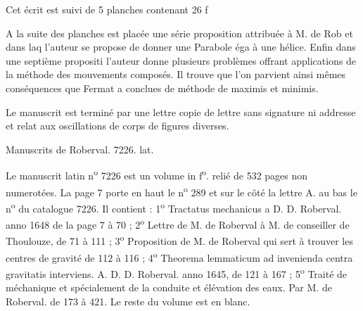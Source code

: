 \documentclass[11pt,a4paper]{article}
\begin{document}

Cet écrit est suivi de 5 planches contenant 26 f\ill{}

A la suite des planches est placée une série\ill{} proposition\ill{} attribuée à M. de Rob et dans laq\ill{} l'auteur se propose de donner une Parabole éga
à une hélice. Enfin dans une septième propositi l'auteur donne plusieurs problèmes offrant \ill{} applications de la méthode des mouvements composés. Il trouve que l'on parvient ainsi \ill{} mêmes conséquences que Fermat a conclues de \ill{} méthode de maximis et minimis.

Le manuscrit est terminé par une lettre \ill{} copie de lettre sans signature ni addresse et relat\ill{} aux oscillations de corps de figures diverses.


Manuscrits de Roberval. 7226. lat.

Le manuscrit latin n\textsuperscript{o} 7226 est un volume in f\textsuperscript{o}. relié de 532 pages non numerotées. La page 7 porte en haut le n\textsuperscript{o} 289 et sur le côté la lettre A. au bas le n\textsuperscript{o} du catalogue 7226. Il contient : 1\textsuperscript{o} Tractatus mechanicus a D. D. Roberval. anno 1648 de la page 7 à 70 ; 2\textsuperscript{o} Lettre de M. de Roberval à M. de  conseiller de Thoulouze, de 71 à 111 ; 3\textsuperscript{o} Proposition de M. de Roberval qui sert à trouver les centres de gravité de 112 à 116 ; 4\textsuperscript{o} Theorema lemmaticum ad invenienda centra gravitatis  interviens. A. D. D. Roberval. anno 1645, de 121 à 167 ; 5\textsuperscript{o} Traité de méchanique et spécialement de la conduite et élévation des eaux. Par M. de Roberval. de 173 à 421. Le reste du volume est en blanc.
\end{document}
